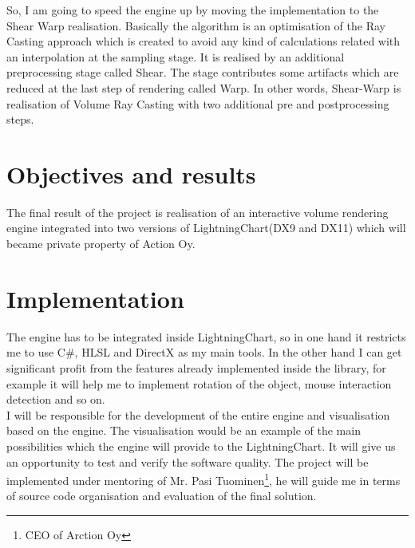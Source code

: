 \documentclass[english]{article}
\begin{document}
So, I am going to speed the engine up by moving the implementation to the Shear Warp realisation. Basically the algorithm is an optimisation of the Ray Casting approach which is created to avoid any kind of calculations related with an interpolation at the sampling stage. It is realised by an additional preprocessing stage called Shear. The stage contributes some artifacts which are reduced at the last step of rendering called Warp. In other words, Shear-Warp is realisation of Volume Ray Casting with two additional pre and postprocessing steps.\\

\section{Objectives and results} 

The final result of the project is realisation of an interactive volume rendering engine integrated into two versions of LightningChart(DX9 and DX11) which will became private property of Action Oy.

\section{Implementation}
The engine has to be integrated inside LightningChart, so in one hand it restricts me to use C\#, HLSL and DirectX as my main tools. In the other hand I can get significant profit from the features already implemented inside the library, for example it will help me to implement rotation of the object, mouse interaction detection and so on.\\

I will be responsible for the development of the entire engine and visualisation based on the engine. The visualisation would be an example of the main possibilities which the engine will provide to the LightningChart. It will give us an opportunity to test and verify the software quality. The project will be implemented under mentoring of Mr. Pasi Tuominen\footnote{CEO of Arction Oy}, he will guide me in terms of source code organisation and evaluation of the final solution.\\
\end{document}
